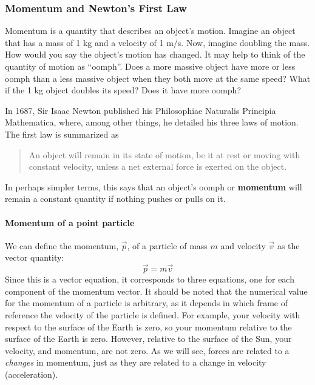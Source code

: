 \subsubsection{Momentum and Newton's First Law}

Momentum is a quantity that describes an object's motion. Imagine an object that has a mass of 1 kg and a velocity of 1 m/s. Now, imagine doubling the mass. How would you say the object's motion has changed. It may help to think of the quantity of motion as ``oomph''. Does a more massive object have more or less oomph than a less massive object when they both move at the same speed? What if the 1 kg object doubles its speed? Does it have more oomph?

In 1687, Sir Isaac Newton published his Philosophiae Naturalis Principia Mathematica, where, among other things, he detailed his three laws of motion. The first law is summarized as

\begin{quote}
An object will remain in its state of motion, be it at rest or moving with constant velocity, unless a net external force is exerted on the object.
\end{quote}

In perhaps simpler terms, this says that an object's oomph or \textbf{momentum} will remain a constant quantity if nothing pushes or pulls on it.

\paragraph{Momentum of a point particle}

We can define the momentum, $\vec p$, of a particle of mass $m$ and velocity $\vec v$ as the vector quantity:
\begin{equation}
\boxed{\vec p = m\vec v}
\end{equation}
Since this is a vector equation, it corresponds to three equations, one for each component of the momentum vector. It should be noted that the numerical value for the momentum of a particle is arbitrary, as it depends in which frame of reference the velocity of the particle is defined. For example, your velocity with respect to the surface of the Earth is zero, so your momentum relative to the surface of the Earth is zero. However, relative to the surface of the Sun, your velocity, and momentum, are not zero. As we will see, forces are related to a \textit{changes} in momentum, just as they are related to a change in velocity (acceleration).

